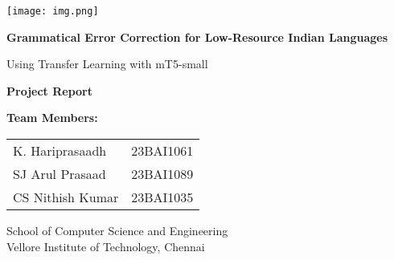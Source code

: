 \documentclass[12pt,a4paper]{article}
\begin{document}
\begin{titlepage}
    \centering
    
    \texttt{[image: img.png]}
    \vspace{1cm}
    
    {\Huge\bfseries Grammatical Error Correction for Low-Resource Indian Languages\par}
    \vspace{0.5cm}
    {\Large Using Transfer Learning with mT5-small\par}
    \vspace{2cm}
    
    {\Large\textbf{Project Report}\par}
    \vspace{1.5cm}
    
    {\large
    \textbf{Team Members:}\par
    \vspace{0.5cm}
    \begin{tabular}{ll}
        K. Hariprasaadh & 23BAI1061 \\
        SJ Arul Prasaad & 23BAI1089 \\
        CS Nithish Kumar & 23BAI1035 \\
    \end{tabular}
    \par}
    
    \vfill
    
    {\large
    School of Computer Science and Engineering\\
    Vellore Institute of Technology, Chennai\\
    \par}
\end{titlepage}

\tableofcontents
\newpage
\end{document}
